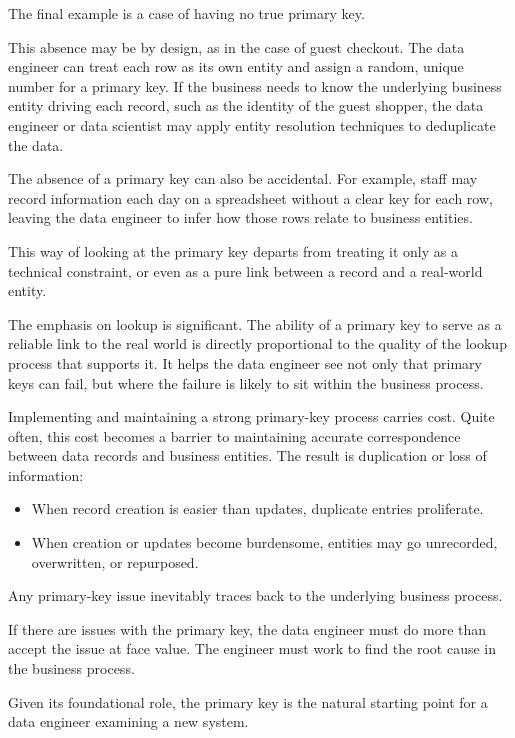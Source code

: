 \documentclass[10pt,openany,10pt]{book}
\providecommand{\tightlist}{%
  \setlength{\itemsep}{0pt}\setlength{\parskip}{0pt}}
\begin{document}
The final example is a case of having no true primary key.

This absence may be by design, as in the case of guest checkout. The
data engineer can treat each row as its own entity and assign a random,
unique number for a primary key. If the business needs to know the
underlying business entity driving each record, such as the identity of
the guest shopper, the data engineer or data scientist may apply entity
resolution techniques to deduplicate the data.

The absence of a primary key can also be accidental. For example, staff
may record information each day on a spreadsheet without a clear key for
each row, leaving the data engineer to infer how those rows relate to
business entities.

This way of looking at the primary key departs from treating it only as
a technical constraint, or even as a pure link between a record and a
real-world entity.

The emphasis on lookup is significant. The ability of a primary key to
serve as a reliable link to the real world is directly proportional to
the quality of the lookup process that supports it. It helps the data
engineer see not only that primary keys can fail, but where the failure
is likely to sit within the business process.

Implementing and maintaining a strong primary-key process carries cost.
Quite often, this cost becomes a barrier to maintaining accurate
correspondence between data records and business entities. The result is
duplication or loss of information:

\begin{itemize}
\tightlist
\item
  When record creation is easier than updates, duplicate entries
  proliferate.
\item
  When creation or updates become burdensome, entities may go
  unrecorded, overwritten, or repurposed.
\end{itemize}

Any primary-key issue inevitably traces back to the underlying business
process.

If there are issues with the primary key, the data engineer must do more
than accept the issue at face value. The engineer must work to find the
root cause in the business process.

Given its foundational role, the primary key is the natural starting
point for a data engineer examining a new system.
\end{document}
